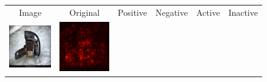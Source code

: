 \documentclass[preprint,12pt]{elsarticle}
\begin{document}
\begin{figure}[p]
  \centering
  \footnotesize
  \newcommand{\scale}{0.25}
  \setlength{\tabcolsep}{2pt}
  \begin{tabular}{cccccc}
  Image & Original & Positive & Negative & Active & Inactive \\
  
  \includegraphics[scale=\scale]{../visualizations/examples/imagenette/resnet18/images/0.png} &
  \includegraphics[scale=\scale]{../visualizations/examples/imagenette/resnet18/saliency_map/0.png} & 

\end{tabular}
\end{figure}
\end{document}
